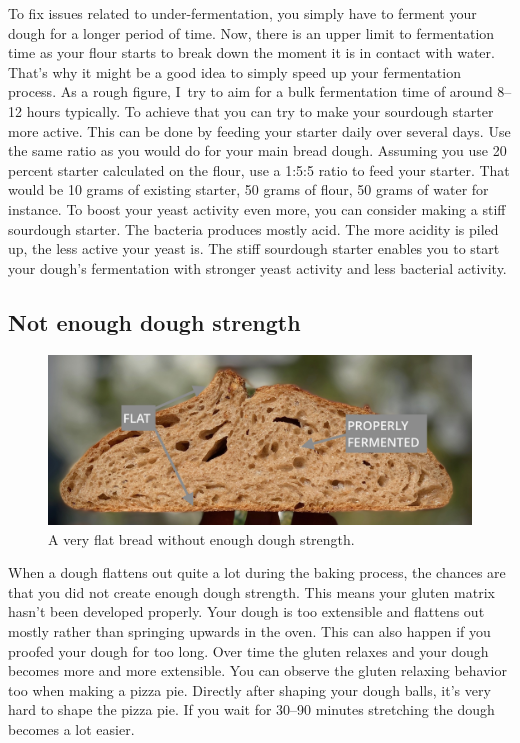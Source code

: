 To fix issues related to under-fermentation, you simply have to ferment your dough
for a longer period of time. Now, there is an upper limit to fermentation time
as your flour starts to break down the moment it is in contact with water. That's why it
might be a good idea to simply speed up your fermentation process. As a rough
figure, I~try to aim for a bulk fermentation time of around 8--12 hours typically.
To achieve that you can try to make your sourdough starter more active.  This can be done
by feeding your starter daily over several days. Use the same ratio as you would
do for your main bread dough. Assuming you use 20 percent starter calculated on the flour,
use a 1:5:5 ratio to feed your starter. That would be 10 grams of existing starter,
50 grams of flour, 50 grams of water for instance.
To boost your yeast activity even more, you can consider making a stiff sourdough
starter. The bacteria produces mostly acid. The more acidity
is piled up, the less active your yeast is. The stiff sourdough starter
enables you to start your dough's fermentation with stronger yeast activity
and less bacterial activity.

\subsection{Not enough dough strength}

\begin{figure}
  \includegraphics[width=\textwidth]{flat-bread}
  \caption{A very flat bread without enough dough strength.}%
  \label{flat-bread}
\end{figure}

When a dough flattens out quite a lot during the baking process, the chances are
that you did not create enough dough strength. This means your gluten matrix
hasn't been developed properly. Your dough is too extensible and flattens out
mostly rather than springing upwards in the oven. This can also happen if you
proofed your dough for too long. Over time the gluten relaxes and your dough
becomes more and more extensible. You can observe the gluten relaxing behavior
too when making a pizza pie. Directly after shaping your dough balls, it's very hard to shape
the pizza pie. If you wait for 30--90 minutes stretching the dough becomes a lot easier.

